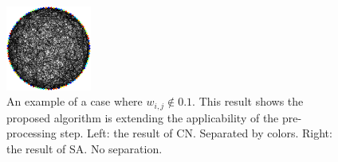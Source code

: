 \documentclass[dvipdfmx,10pt,journal,compsoc]{IEEEtran}
\begin{document}
\begin{figure}[!t]
\begin{minipage}{\columnwidth}
\begin{minipage}{0.4\columnwidth}
    \end{minipage}
    \begin{minipage}{0.4\columnwidth}
      \centering
      \includegraphics[height=2.8cm]{circle/vis/dense_SA-L-BFGS_10.png}
    \end{minipage}
    \caption{
      An example of a case where $w_{i,j} \notin \qty{0,1}$.
      This result shows the proposed algorithm is extending the applicability of the pre-processing step.
      Left: the result of \textsf{CN}. Separated by colors.
      Right: the result of \textsf{SA}. No separation.
    }
    \label{fig:weightedDense}
  \end{minipage}
\end{figure}
\end{document}
